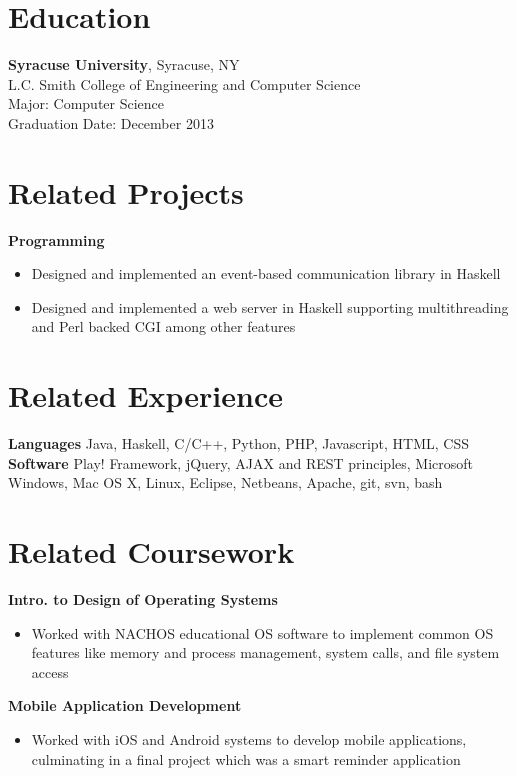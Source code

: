 \documentclass[margin]{res}
\begin{document}
 
 
 
\address{{\bf Address} \\ 28 Sand Pond Road \\ Warwick, RI 02888 \\ danielwilsonthomas@gmail.com}
 
\begin{resume} 
 
\section{Education} 
{\bf Syracuse University}, Syracuse, NY \\
L.C. Smith College of Engineering and Computer Science \\
Major: Computer Science \\
Graduation Date: December 2013

\section{Related Projects}
{\bf Programming} 
\begin{itemize} %
\item Designed and implemented an event-based communication library in Haskell
\item Designed and implemented a web server in Haskell supporting multithreading and Perl backed CGI among other features
\end{itemize}

\section{Related Experience}
 {\bf Languages} Java, Haskell, C/C++, Python, PHP, Javascript, HTML, CSS \\
 {\bf Software} Play! Framework, jQuery, AJAX and REST principles, Microsoft Windows, Mac OS X, Linux, Eclipse, Netbeans, Apache, git, svn, bash

\section{Related Coursework}
{\bf Intro. to Design of Operating Systems}
\begin{itemize}
\item Worked with NACHOS educational OS software to implement common OS features like memory and process management, system calls, and file system access
\end{itemize}
{\bf Mobile Application Development}
\begin{itemize}
\item Worked with iOS and Android systems to develop mobile applications, culminating in a final project which was a smart reminder application
\end{itemize}


\end{resume}
\end{document}
